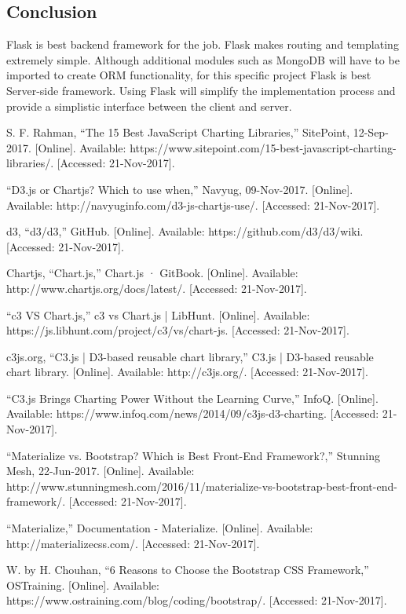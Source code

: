 \documentclass[onecolumn, draftclsnofoot,10pt, compsoc]{IEEEtran}
\begin{document}
\subsection{Conclusion}
Flask is best backend framework for the job. Flask makes routing and templating extremely simple. Although additional modules such as MongoDB will have to be imported to create ORM functionality, for this specific project Flask is best Server-side framework. Using Flask will simplify the implementation process and provide a simplistic interface between the client and server.


\begin{thebibliography}{9}
S. F. Rahman, “The 15 Best JavaScript Charting Libraries,” SitePoint, 12-Sep-2017. [Online]. Available: https://www.sitepoint.com/15-best-javascript-charting-libraries/. [Accessed: 21-Nov-2017].

“D3.js or Chartjs? Which to use when,” Navyug, 09-Nov-2017. [Online]. Available: http://navyuginfo.com/d3-js-chartjs-use/. [Accessed: 21-Nov-2017].

d3, “d3/d3,” GitHub. [Online]. Available: https://github.com/d3/d3/wiki. [Accessed: 21-Nov-2017].

Chartjs, “Chart.js,” Chart.js · GitBook. [Online]. Available: http://www.chartjs.org/docs/latest/. [Accessed: 21-Nov-2017].


“c3 VS Chart.js,” c3 vs Chart.js | LibHunt. [Online]. Available: https://js.libhunt.com/project/c3/vs/chart-js. [Accessed: 21-Nov-2017].

c3js.org, “C3.js | D3-based reusable chart library,” C3.js | D3-based reusable chart library. [Online]. Available: http://c3js.org/. [Accessed: 21-Nov-2017].

“C3.js Brings Charting Power Without the Learning Curve,” InfoQ. [Online]. Available: https://www.infoq.com/news/2014/09/c3js-d3-charting. [Accessed: 21-Nov-2017].

“Materialize vs. Bootstrap? Which is Best Front-End Framework?,” Stunning Mesh, 22-Jun-2017. [Online]. Available: http://www.stunningmesh.com/2016/11/materialize-vs-bootstrap-best-front-end-framework/. [Accessed: 21-Nov-2017].

“Materialize,” Documentation - Materialize. [Online]. Available: http://materializecss.com/. [Accessed: 21-Nov-2017].

W. by H. Chouhan, “6 Reasons to Choose the Bootstrap CSS Framework,” OSTraining. [Online]. Available: https://www.ostraining.com/blog/coding/bootstrap/. [Accessed: 21-Nov-2017].


\end{thebibliography}
\end{document}
